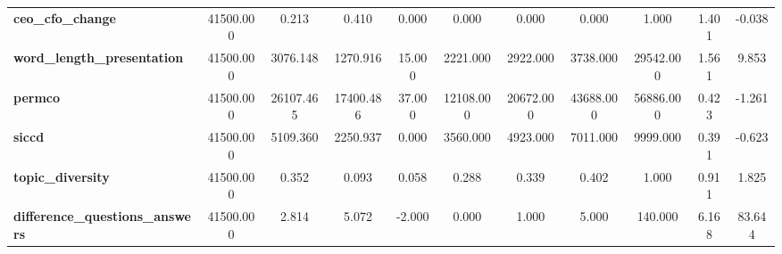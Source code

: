 \begin{table}
\begin{tabular}{lcccccccccc}
\textbf{ceo_cfo_change} & 41500.000 & 0.213 & 0.410 & 0.000 & 0.000 & 0.000 & 0.000 & 1.000 & 1.401 & -0.038 \\
\textbf{word_length_presentation} & 41500.000 & 3076.148 & 1270.916 & 15.000 & 2221.000 & 2922.000 & 3738.000 & 29542.000 & 1.561 & 9.853 \\
\textbf{permco} & 41500.000 & 26107.465 & 17400.486 & 37.000 & 12108.000 & 20672.000 & 43688.000 & 56886.000 & 0.423 & -1.261 \\
\textbf{siccd} & 41500.000 & 5109.360 & 2250.937 & 0.000 & 3560.000 & 4923.000 & 7011.000 & 9999.000 & 0.391 & -0.623 \\
\textbf{topic_diversity} & 41500.000 & 0.352 & 0.093 & 0.058 & 0.288 & 0.339 & 0.402 & 1.000 & 0.911 & 1.825 \\
\textbf{difference_questions_answers} & 41500.000 & 2.814 & 5.072 & -2.000 & 0.000 & 1.000 & 5.000 & 140.000 & 6.168 & 83.644 \\
\bottomrule
\end{tabular}
\end{table}
